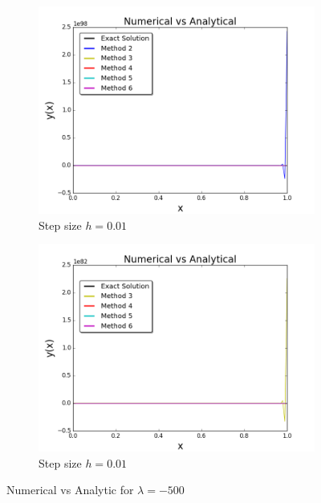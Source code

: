 \documentclass[12pt]{article}
\theoremstyle{remark}
\begin{document}
\begin{figure}[H]
	\centering
	\begin{subfigure}{.55\textwidth}
		\centering
		\includegraphics[width=1\linewidth]{reg_-500_01.png}
		\caption{Step size $h = 0.01$}
		\label{fig:sub1}
	\end{subfigure}%
	\begin{subfigure}{.55\textwidth}
		\centering
		\includegraphics[width=1\linewidth]{reg_-500_01(1).png}
		\caption{Step size $h = 0.01$}
		\label{fig:sub2}
	\end{subfigure}
	\caption{Numerical vs Analytic for $\lambda = -500$}
	\label{fig:test}
\end{figure}
\end{document}
